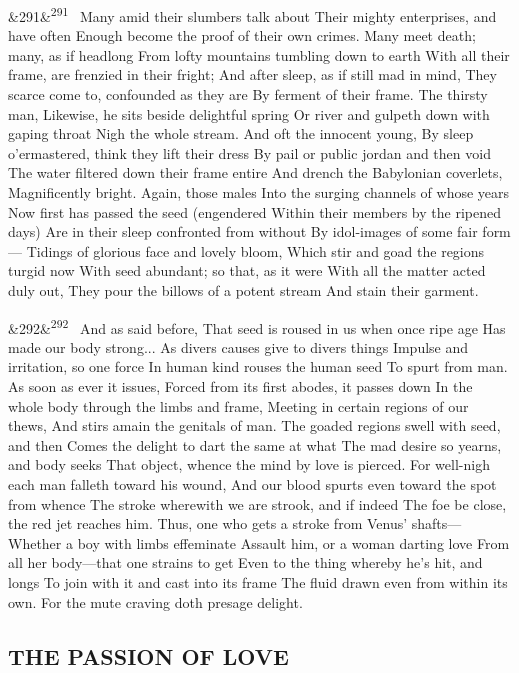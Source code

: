 \documentclass[12pt]{article}
\newcommand{\para}[1][]{\par\noindent\ifx&#1&\else\textsuperscript{\footnotesize #1}~\fi}
\begin{document}
\para[291] Many amid their slumbers talk about Their mighty enterprises, and have often Enough become the proof of their own crimes. Many meet death; many, as if headlong From lofty mountains tumbling down to earth With all their frame, are frenzied in their fright; And after sleep, as if still mad in mind, They scarce come to, confounded as they are By ferment of their frame. The thirsty man, Likewise, he sits beside delightful spring Or river and gulpeth down with gaping throat Nigh the whole stream. And oft the innocent young, By sleep o'ermastered, think they lift their dress By pail or public jordan and then void The water filtered down their frame entire And drench the Babylonian coverlets, Magnificently bright. Again, those males Into the surging channels of whose years Now first has passed the seed (engendered Within their members by the ripened days) Are in their sleep confronted from without By idol-images of some fair form--- Tidings of glorious face and lovely bloom, Which stir and goad the regions turgid now With seed abundant; so that, as it were With all the matter acted duly out, They pour the billows of a potent stream And stain their garment.

\para[292] And as said before, That seed is roused in us when once ripe age Has made our body strong... As divers causes give to divers things Impulse and irritation, so one force In human kind rouses the human seed To spurt from man. As soon as ever it issues, Forced from its first abodes, it passes down In the whole body through the limbs and frame, Meeting in certain regions of our thews, And stirs amain the genitals of man. The goaded regions swell with seed, and then Comes the delight to dart the same at what The mad desire so yearns, and body seeks That object, whence the mind by love is pierced. For well-nigh each man falleth toward his wound, And our blood spurts even toward the spot from whence The stroke wherewith we are strook, and if indeed The foe be close, the red jet reaches him. Thus, one who gets a stroke from Venus' shafts--- Whether a boy with limbs effeminate Assault him, or a woman darting love From all her body---that one strains to get Even to the thing whereby he's hit, and longs To join with it and cast into its frame The fluid drawn even from within its own. For the mute craving doth presage delight.

\subsection*{THE PASSION OF LOVE}
\end{document}
